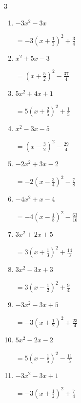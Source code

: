 \begin{multicols}{3}
\begin{enumerate}
        $\displaystyle =-\left( x+\frac{5}{2}\right)^{2}+\frac{21}{4}$

  \item $-3x^{2}-3x$

        $\displaystyle =-3\left( x+\frac{1}{2}\right)^{2}+\frac{3}{4}$

\columnbreak %

  \item $x^{2}+5x-3$

        $\displaystyle =\left( x+\frac{5}{2}\right)^{2}-\frac{37}{4}$

  \item $5x^{2}+4x+1$

        $\displaystyle =5\left( x+\frac{2}{5}\right)^{2}+\frac{1}{5}$

  \item $x^{2}-3x-5$

        $\displaystyle =\left( x-\frac{3}{2}\right)^{2}-\frac{29}{4}$

  \item $-2x^{2}+3x-2$

        $\displaystyle =-2\left( x-\frac{3}{4}\right)^{2}-\frac{7}{8}$

  \item $-4x^{2}+x-4$

        $\displaystyle =-4\left( x-\frac{1}{8}\right)^{2}-\frac{63}{16}$

\columnbreak %

\resetques

  \item $3x^{2}+2x+5$

        $\displaystyle =3\left( x+\frac{1}{3}\right)^{2}+\frac{14}{3}$

  \item $3x^{2}-3x+3$

        $\displaystyle =3\left( x-\frac{1}{2}\right)^{2}+\frac{9}{4}$

  \item $-3x^{2}-3x+5$

        $\displaystyle =-3\left( x+\frac{1}{2}\right)^{2}+\frac{23}{4}$

  \item $5x^{2}-2x-2$

        $\displaystyle =5\left( x-\frac{1}{5}\right)^{2}-\frac{11}{5}$

  \item $-3x^{2}-3x+1$

        $\displaystyle =-3\left( x+\frac{1}{2}\right)^{2}+\frac{7}{4}$


\end{enumerate}
\end{multicols}
